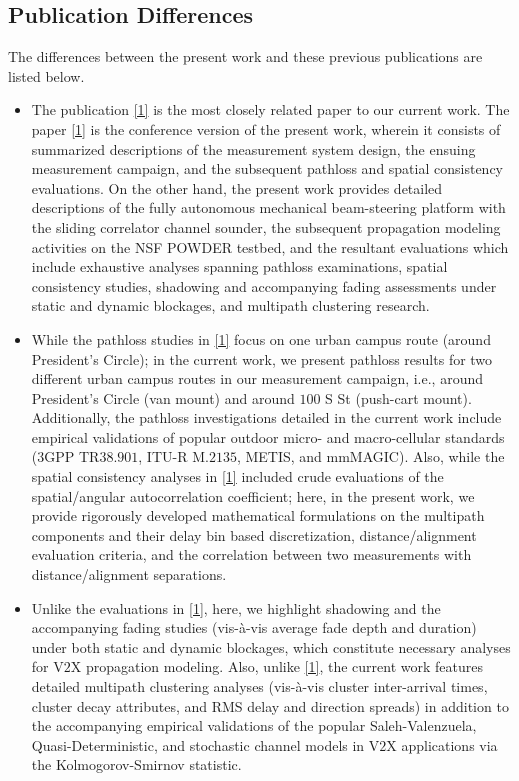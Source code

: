 \documentclass[12pt, draftcls, onecolumn]{IEEEtran}
\begin{document}
\subsection{Publication Differences}
The differences between the present work and these previous publications are listed below.
\begin{itemize}
    \item The publication \ref{1} is the most closely related paper to our current work. The paper \ref{1} is the conference version of the present work, wherein it consists of summarized descriptions of the measurement system design, the ensuing measurement campaign, and the subsequent pathloss and spatial consistency evaluations. On the other hand, the present work provides detailed descriptions of the fully autonomous mechanical beam-steering platform with the sliding correlator channel sounder, the subsequent propagation modeling activities on the NSF POWDER testbed, and the resultant evaluations which include exhaustive analyses spanning pathloss examinations, spatial consistency studies, shadowing and accompanying fading assessments under static and dynamic blockages, and multipath clustering research.
    \item While the pathloss studies in \ref{1} focus on one urban campus route (around President's Circle); in the current work, we present pathloss results for two different urban campus routes in our measurement campaign, i.e., around President's Circle (van mount) and around $100$ S St (push-cart mount). Additionally, the pathloss investigations detailed in the current work include empirical validations of popular outdoor micro- and macro-cellular standards ($3$GPP TR$38.901$, ITU-R M$.2135$, METIS, and mmMAGIC). Also, while the spatial consistency analyses in \ref{1} included crude evaluations of the spatial/angular autocorrelation coefficient; here, in the present work, we provide rigorously developed mathematical formulations on the multipath components and their delay bin based discretization, distance/alignment evaluation criteria, and the correlation between two measurements with distance/alignment separations.
    \item Unlike the evaluations in \ref{1}, here, we highlight shadowing and the accompanying fading studies (vis-\`{a}-vis average fade depth and duration) under both static and dynamic blockages, which constitute necessary analyses for V$2$X propagation modeling. Also, unlike \ref{1}, the current work features detailed multipath clustering analyses (vis-\`{a}-vis cluster inter-arrival times, cluster decay attributes, and RMS delay and direction spreads) in addition to the accompanying empirical validations of the popular Saleh-Valenzuela, Quasi-Deterministic, and stochastic channel models in V$2$X applications via the Kolmogorov-Smirnov statistic.

\end{itemize}
\end{document}
